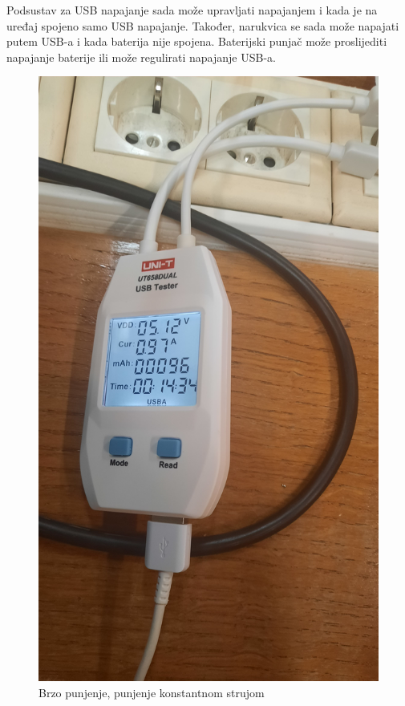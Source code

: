 Podsustav za USB napajanje sada može upravljati napajanjem i kada je na uređaj spojeno samo USB napajanje. Također, narukvica se sada može napajati putem USB-a i kada baterija nije spojena. Baterijski punjač može proslijediti napajanje baterije ili može regulirati napajanje USB-a.
\begin{figure}[htb]
    \centering
    \includegraphics[width=10 cm]{Figures/BR_TEST_04.jpg}
    \caption{Brzo punjenje, punjenje konstantnom strujom}
    \label{slk:BR_TEST_04}
\end{figure}
